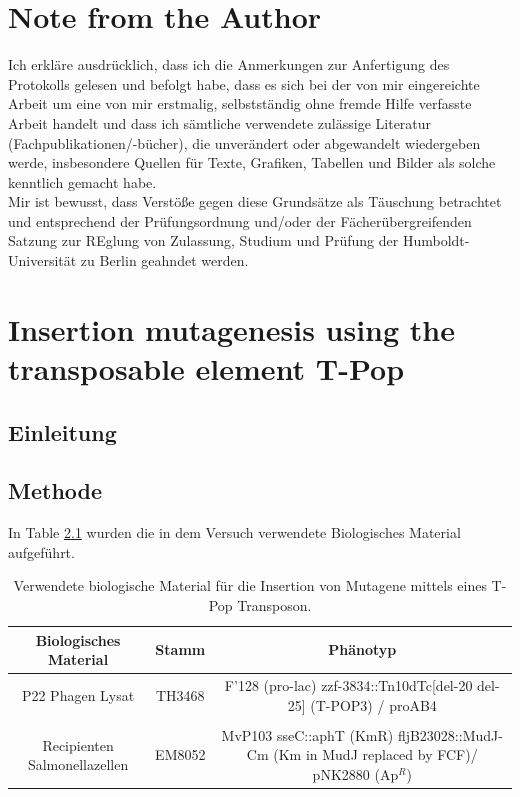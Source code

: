 \documentclass[oneside,10pt,a4paper]{report}
\begin{document}
	\chapter{Note from the Author}
	Ich erkläre ausdrücklich, dass ich die Anmerkungen zur Anfertigung des Protokolls gelesen und befolgt habe, dass es sich bei der von mir eingereichte Arbeit um eine von mir erstmalig, selbstständig ohne fremde Hilfe verfasste Arbeit handelt und dass ich sämtliche verwendete zulässige Literatur (Fachpublikationen/-bücher), die unverändert oder abgewandelt wiedergeben werde, insbesondere Quellen für Texte, Grafiken, Tabellen und Bilder als solche kenntlich gemacht habe.\\
	Mir ist bewusst, dass Verstöße gegen diese Grundsätze als Täuschung betrachtet und entsprechend der Prüfungsordnung und/oder der Fächerübergreifenden Satzung zur REglung von Zulassung, Studium und Prüfung der Humboldt-Universität zu Berlin geahndet werden.
	
	
	\chapter{Insertion mutagenesis using the transposable element T-Pop}	
	
		\section{Einleitung}
		
		\section{Methode}
		In Table \ref{tab: exp2-biologisches Material} wurden die in dem Versuch verwendete Biologisches Material aufgeführt.
		
			\begin{table}[H]
			\centering
			\caption{Verwendete biologische Material für die Insertion von Mutagene mittels eines T-Pop Transposon.}
			\label{tab: exp2-biologisches Material}
			\begin{tabular}{ccc}
				\toprule
				Biologisches Material& Stamm & Phänotyp\\
				\midrule
				\multirow{2}{*}{P22 Phagen Lysat} & \multirow{2}{*}{TH3468} & \multirow{2}{*}{\parbox[t]{9cm}{F’128 (pro-lac) zzf-3834::Tn10dTc[del-20 del-25] (T-POP3) / proAB4}}\\
				&&\\
				&&\\
				\multirow{3}{*}{\parbox[t]{3cm}{Recipienten Salmonellazellen}} & \multirow{3}{*}{EM8052} &\multirow{3}{*}{\parbox[t]{9cm}{MvP103 sseC::aphT (KmR) fljB23028::MudJ-Cm (Km in MudJ replaced by FCF)/ pNK2880 (Ap$^R$)}} \\
				&&\\
				&&\\

				\bottomrule			
			\end{tabular}
		\end{table}
\end{document}
